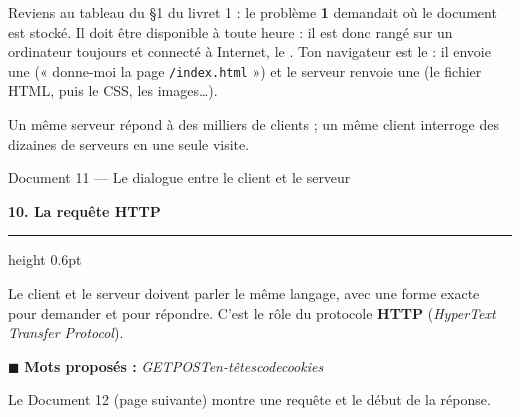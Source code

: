 \documentclass[11pt,a4paper]{article}
\newif\ifprof
\newcommand{\sect}[1]{%
  \par\addvspace{10pt}%
  {\color{navy}\Large\bfseries #1\par}\vspace{3pt}%
  {\color{navy}\hrule height 0.6pt}\vspace{6pt}}
\newcommand{\trou}[2][3cm]{\ifprof\textcolor{corr}{\underline{\textbf{\,#2\,}}}\else\underline{\hspace{#1}}\fi}
\newcommand{\motsproposes}[1]{\begin{mots}\small\textcolor{orangeT}{$\blacksquare$ \textbf{Mots proposés :}} \textit{#1}\end{mots}}
\begin{document}
Reviens au tableau du §1 du livret 1 : le problème \textbf{1} demandait où le document est stocké. Il doit être disponible à toute heure : il est donc rangé sur un ordinateur toujours \trou[2cm]{allumé} et connecté à Internet, le \trou[2cm]{serveur}. Ton navigateur est le \trou[2cm]{client} : il envoie une \trou[2cm]{requête} (« donne-moi la page \texttt{/index.html} ») et le serveur renvoie une \trou[2cm]{réponse} (le fichier HTML, puis le CSS, les images…).

Un même serveur répond à des milliers de clients ; un même client interroge des dizaines de serveurs en une seule visite.

\begin{docbox}{Document 11 — Le dialogue entre le client et le serveur}
\begin{center}
\end{center}
\end{docbox}

\sect{10. La requête HTTP}

Le client et le serveur doivent parler le même langage, avec une forme exacte pour demander et pour répondre. C'est le rôle du protocole \textbf{HTTP} (\emph{HyperText Transfer Protocol}).

\motsproposes{GET\enspace\textbullet\enspace POST\enspace\textbullet\enspace en-têtes\enspace\textbullet\enspace code\enspace\textbullet\enspace 404\enspace\textbullet\enspace cookies}

Le Document 12 (page suivante) montre une requête et le début de la réponse.
\end{document}
